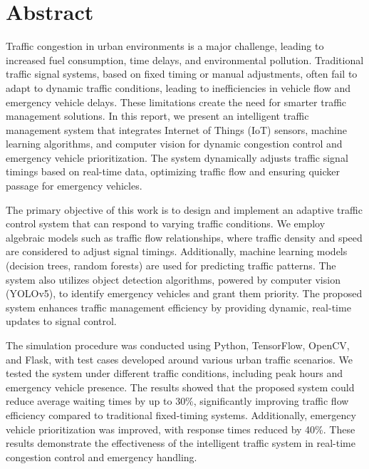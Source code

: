 \documentclass[12pt]{report}
\begin{document}
\pagebreak

\vspace{-1cm}

\section*{Abstract}

\hspace*{1em}Traffic congestion in urban environments is a major challenge, leading to increased fuel consumption, time delays, and environmental pollution. Traditional traffic signal systems, based on fixed timing or manual adjustments, often fail to adapt to dynamic traffic conditions, leading to inefficiencies in vehicle flow and emergency vehicle delays. These limitations create the need for smarter traffic management solutions. In this report, we present an intelligent traffic management system that integrates Internet of Things (IoT) sensors, machine learning algorithms, and computer vision for dynamic congestion control and emergency vehicle prioritization. The system dynamically adjusts traffic signal timings based on real-time data, optimizing traffic flow and ensuring quicker passage for emergency vehicles.

\vspace{0.75em}

\hspace*{1em}The primary objective of this work is to design and implement an adaptive traffic control system that can respond to varying traffic conditions. We employ algebraic models such as traffic flow relationships, where traffic density and speed are considered to adjust signal timings. Additionally, machine learning models (decision trees, random forests) are used for predicting traffic patterns. The system also utilizes object detection algorithms, powered by computer vision (YOLOv5), to identify emergency vehicles and grant them priority. The proposed system enhances traffic management efficiency by providing dynamic, real-time updates to signal control.

\vspace{0.75em}

\hspace*{1em}The simulation procedure was conducted using Python, TensorFlow, OpenCV, and Flask, with test cases developed around various urban traffic scenarios. We tested the system under different traffic conditions, including peak hours and emergency vehicle presence. The results showed that the proposed system could reduce average waiting times by up to 30\%, significantly improving traffic flow efficiency compared to traditional fixed-timing systems. Additionally, emergency vehicle prioritization was improved, with response times reduced by 40\%. These results demonstrate the effectiveness of the intelligent traffic system in real-time congestion control and emergency handling.
\end{document}
